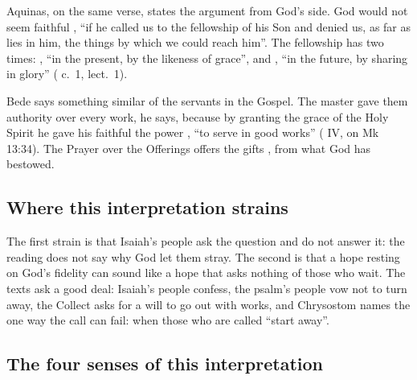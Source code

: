Aquinas, on the same verse, states the argument from God's side. God would
not seem faithful , ``if
he called us to the fellowship of his Son and denied us, as far as lies in
him, the things by which we could reach him''. The fellowship has two times:
, ``in the present, by the
likeness of grace'', and , ``in
the future, by sharing in glory'' ( c.~1,
lect.~1).

Bede says something similar of the servants in the Gospel. The master gave
them authority over every work, he says, because by granting the grace of the
Holy Spirit he gave his faithful the power ,
``to serve in good works'' ( IV, on
Mk 13:34). The Prayer over the Offerings offers the gifts , from what God has bestowed.

\subsection{Where this interpretation strains}

The first strain is that Isaiah's people ask the question and do not answer
it: the reading does not say why God let them stray. The second is that a
hope resting on God's fidelity can sound like a hope that asks nothing of those who wait. The texts ask a good deal: Isaiah's
people confess, the psalm's people vow not to turn away, the Collect asks for
a will to go out with works, and Chrysostom names the one way the call can
fail: when those who are called ``start away''.

\subsection{The four senses of this interpretation}

